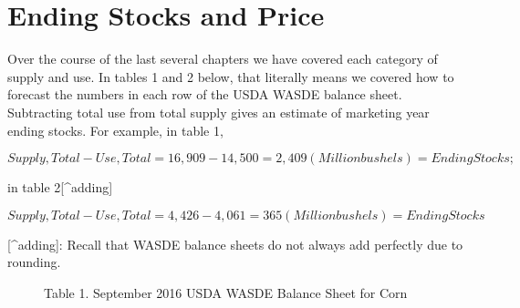 \documentclass[]{book}
\theoremstyle{definition}
\theoremstyle{definition}
\theoremstyle{remark}
\begin{document}
\chapter{Ending Stocks and Price}\label{ending-stocks-and-price}

Over the course of the last several chapters we have covered each
category of supply and use. In tables 1 and 2 below, that literally
means we covered how to forecast the numbers in each row of the USDA
WASDE balance sheet. Subtracting total use from total supply gives an
estimate of marketing year ending stocks. For example, in table 1,

\[Supply, Total - Use, Total = 16,909 - 14,500 = 2,409 (Million bushels) = Ending Stocks;\]

in table 2{[}\^{}adding{]}

\[Supply, Total - Use, Total = 4,426 - 4,061 = 365 (Million bushels) = Ending Stocks\]

\begin{description}
\item[{[}\^{}adding{]}: Recall that WASDE balance sheets do not always
add perfectly due to rounding.]
Table 1. September 2016 USDA WASDE Balance Sheet for Corn
\end{description}
\end{document}
